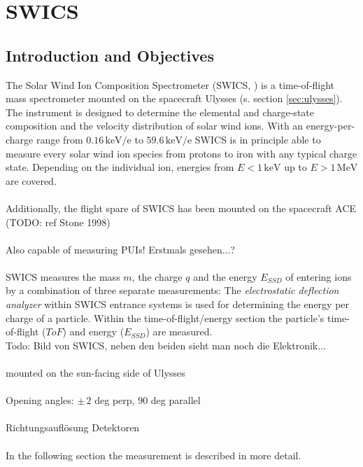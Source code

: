 \section{SWICS}

\subsection{Introduction and Objectives}
The Solar Wind Ion Composition Spectrometer (SWICS, \citet{gloeckler_1992}) is a time-of-flight mass spectrometer mounted on the spacecraft Ulysses (s. section \ref{sec:ulysses}). The instrument is designed to determine the elemental and charge-state composition and the velocity distribution of solar wind ions. With an energy-per-charge range from $0.16 \, \mathrm{keV/e}$ to $59.6 \, \mathrm{keV / e}$ SWICS is in principle able to measure every solar wind ion species from protons to iron with any typical charge state. Depending on the individual ion, energies from $E < 1 \,\mathrm{keV}$ up to $E > 1 \, \mathrm{MeV}$ are covered.
\\ \\
Additionally, the flight spare of SWICS has been mounted on the spacecraft ACE (TODO: ref Stone 1998)
\\ \\ 
Also capable of measuring PUIs! Erstmals gesehen...?
\\ \\
SWICS measures the mass $m$, the charge $q$ and the energy $E_{SSD}$ of entering ions by a combination of three separate measurements: The \textit{electrostatic deflection analyzer} within SWICS entrance systems is used for determining the energy per charge of a particle. Within the time-of-flight/energy section the particle's time-of-flight ($ToF$) and energy ($E_{SSD}$) are measured. \\ 
Todo: Bild von SWICS, neben den beiden sieht man noch die Elektronik...
\\ \\
mounted on the sun-facing side of Ulysses
\\ \\
Opening angles: $\pm\, 2$ deg perp, $90$ deg parallel  
\\ \\
Richtungsauflösung Detektoren
\\ \\ 
In the following section the measurement is described in more detail.
